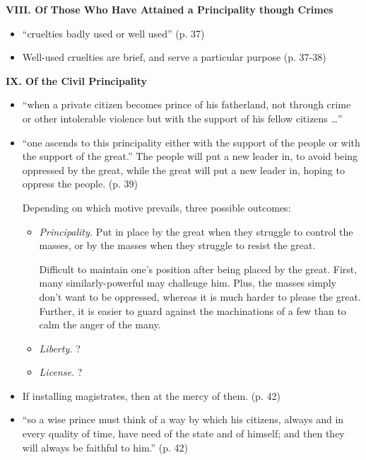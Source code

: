 \documentclass[10pt]{article}
\newcommand{\keyquote}[1]{{\color{BrickRed}#1}}
\begin{document}
\textbf{VIII. Of Those Who Have Attained a Principality though Crimes}
\begin{itemize}
    \item 
        ``cruelties badly used or well used'' (p. 37)
    \item
        Well-used cruelties are brief, and serve a particular purpose
        (p. 37-38)
\end{itemize}

\textbf{IX. Of the Civil Principality}
\begin{itemize}
    \item
        ``when a private citizen becomes prince of his fatherland, not
        through crime or other intolerable violence but with the 
        support of his fellow citizens \ldots''    
    \item 
        ``one ascends to this principality either with the 
        support of the people or with the support of the great.''
        The people will put a new leader in, to avoid being oppressed
        by the great, while the great will put a new leader in, hoping
        to oppress the people. (p. 39) 

        Depending on which motive prevails, three possible outcomes:
        \begin{itemize}
            \item \textsl{Principality.} 
                Put in place by the great when they struggle to control 
                the masses, or by the masses when they struggle to resist
                the great.
            
                Difficult to maintain one's position after being placed by 
                the great. First, many
                similarly-powerful may challenge him. Plus, the masses
                simply don't want to be oppressed, whereas it is much
                harder to please the great. Further, it is easier to
                guard against the machinations of a few than to calm
                the anger of the many.    

            \item \textsl{Liberty.}
                ?
            \item \textsl{License.}
                ?
        \end{itemize}
    \item
        If installing magistrates, then at the mercy of them. (p. 42)
    \item
        \keyquote{ 
        ``so a wise prince must think of a way by which his citizens, always
        and in every quality of time, have need of the state and of himself;
        and then they will always be faithful to him.''} (p. 42)
\end{itemize}
\end{document}
